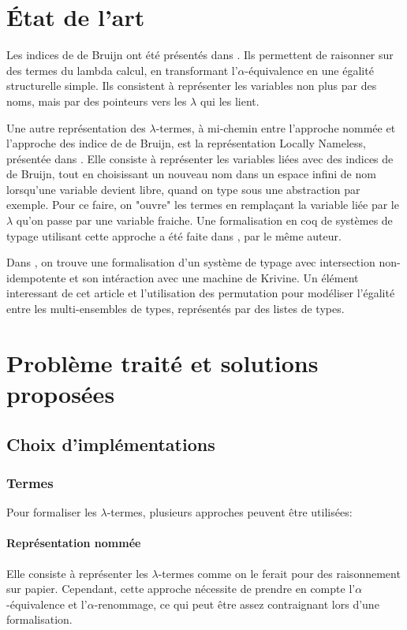 \documentclass[10pt]{article}
\begin{document}
\section{État de l'art} \label{EtatArt}
Les indices de de Bruijn ont été présentés dans \cite{de-bruijn}. Ils permettent de raisonner sur des termes du lambda calcul, en transformant l'$\alpha$-équivalence en une égalité structurelle simple. Ils consistent à représenter les variables non plus par des noms, mais par des pointeurs vers les $\lambda$ qui les lient.

Une autre représentation des $\lambda$-termes, à mi-chemin entre l'approche nommée et l'approche des indice de de Bruijn, est la représentation Locally Nameless, présentée dans \cite{locally-nameless}. Elle consiste à représenter les variables liées avec des indices de de Bruijn, tout en choisissant un nouveau nom dans un espace infini de nom lorsqu'une variable devient libre, quand on type sous une abstraction par exemple. Pour ce faire, on "ouvre" les termes en remplaçant la variable liée par le $\lambda$ qu'on passe par une variable fraiche. Une formalisation en coq de systèmes de typage utilisant cette approche a été faite dans \cite{ln-coq}, par le même auteur.


Dans \cite{agda}, on trouve une formalisation d'un système de typage avec intersection non-idempotente et son intéraction avec une machine de Krivine. Un élément interessant de cet article et l'utilisation des permutation pour modéliser l'égalité entre les multi-ensembles de types, représentés par des listes de types.


\section[Problème et solutions]{Problème traité et solutions proposées}
\subsection{Choix d'implémentations}
\subsubsection{Termes}
Pour formaliser les $\lambda$-termes, plusieurs approches peuvent être utilisées:
\paragraph{Représentation nommée} 
Elle consiste à représenter les $\lambda$-termes comme on le ferait pour des raisonnement sur papier. Cependant, cette approche nécessite de prendre en compte l'$\alpha$-équivalence et l'$\alpha$-renommage, ce qui peut être assez contraignant lors d'une formalisation.
\end{document}

